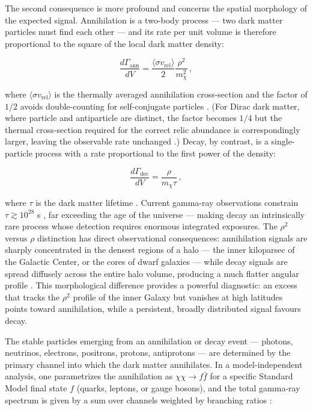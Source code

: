 The second consequence is more profound and concerns the spatial morphology of the expected signal.
Annihilation is a two-body process --- two dark matter particles must find each other --- and its rate per unit volume is therefore proportional to the square of the local dark matter density:

\begin{equation}
	\frac{d\Gamma_\text{ann}}{dV} = \frac{\langle \sigma v_\text{rel} \rangle}{2} \frac{\rho^2}{m_\chi^2} \,,
	\label{eq:ann_rate}
\end{equation}

where $\langle \sigma v_\text{rel} \rangle$ is the thermally averaged annihilation cross-section and the factor of $1/2$ avoids double-counting for self-conjugate particles \cite{Hooper:2024,Cirelli:2024ssz}.
(For Dirac dark matter, where particle and antiparticle are distinct, the factor becomes $1/4$ but the thermal cross-section required for the correct relic abundance is correspondingly larger, leaving the observable rate unchanged \cite{Hooper:2024}.) Decay, by contrast, is a single-particle process with a rate proportional to the first power of the density:

\begin{equation}
	\frac{d\Gamma_\text{dec}}{dV} = \frac{\rho}{m_\chi \tau} \,,
	\label{eq:dec_rate}
\end{equation}

where $\tau$ is the dark matter lifetime \cite{Hooper:2024,Pinetti:2021jjs}.
Current gamma-ray observations constrain $\tau \gtrsim 10^{28}$ s \cite{Cirelli:2024ssz}, far exceeding the age of the universe --- making decay an intrinsically rare process whose detection requires enormous integrated exposures.
The $\rho^2$ versus $\rho$ distinction has direct observational consequences: annihilation signals are sharply concentrated in the densest regions of a halo --- the inner kiloparsec of the Galactic Center, or the cores of dwarf galaxies --- while decay signals are spread diffusely across the entire halo volume, producing a much flatter angular profile \cite{Cirelli:2024ssz}.
This morphological difference provides a powerful diagnostic: an excess that tracks the $\rho^2$ profile of the inner Galaxy but vanishes at high latitudes points toward annihilation, while a persistent, broadly distributed signal favours decay.

The stable particles emerging from an annihilation or decay event --- photons, neutrinos, electrons, positrons, protons, antiprotons --- are determined by the primary channel into which the dark matter annihilates.
In a model-independent analysis, one parametrizes the annihilation as $\chi\chi \to f\bar{f}$ for a specific Standard Model final state $f$ (quarks, leptons, or gauge bosons), and the total gamma-ray spectrum is given by a sum over channels weighted by branching ratios \cite{Cirelli:2024ssz}:

